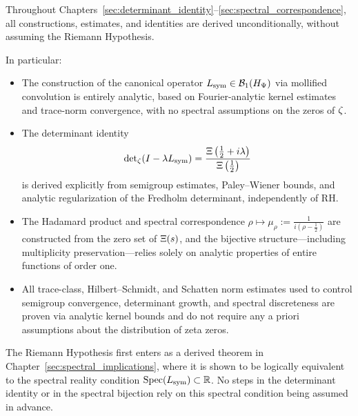 \begin{remark}
\label{rem:no_rh_assumption}
Throughout Chapters~\ref{sec:determinant_identity}–\ref{sec:spectral_correspondence}, all constructions, estimates, and identities are derived unconditionally, without assuming the Riemann Hypothesis.

In particular:
\begin{itemize}
  \item The construction of the canonical operator \( L_{\mathrm{sym}} \in \mathcal{B}_1(H_{\Psi}) \) via mollified convolution is entirely analytic, based on Fourier-analytic kernel estimates and trace-norm convergence, with no spectral assumptions on the zeros of \( \zeta \).
  
  \item The determinant identity
  \[
  \det\nolimits_\zeta(I - \lambda L_{\mathrm{sym}}) = \frac{\Xi\left( \tfrac{1}{2} + i\lambda \right)}{\Xi\left( \tfrac{1}{2} \right)}
  \]
  is derived explicitly from semigroup estimates, Paley–Wiener bounds, and analytic regularization of the Fredholm determinant, independently of RH.

  \item The Hadamard product and spectral correspondence \( \rho \mapsto \mu_\rho := \tfrac{1}{i(\rho - \tfrac{1}{2})} \) are constructed from the zero set of \( \Xi(s) \), and the bijective structure—including multiplicity preservation—relies solely on analytic properties of entire functions of order one.

  \item All trace-class, Hilbert–Schmidt, and Schatten norm estimates used to control semigroup convergence, determinant growth, and spectral discreteness are proven via analytic kernel bounds and do not require any a priori assumptions about the distribution of zeta zeros.
\end{itemize}

\noindent
The Riemann Hypothesis first enters as a derived theorem in Chapter~\ref{sec:spectral_implications}, where it is shown to be logically equivalent to the spectral reality condition \( \operatorname{Spec}(L_{\mathrm{sym}}) \subset \mathbb{R} \). No steps in the determinant identity or in the spectral bijection rely on this spectral condition being assumed in advance.
\end{remark}
